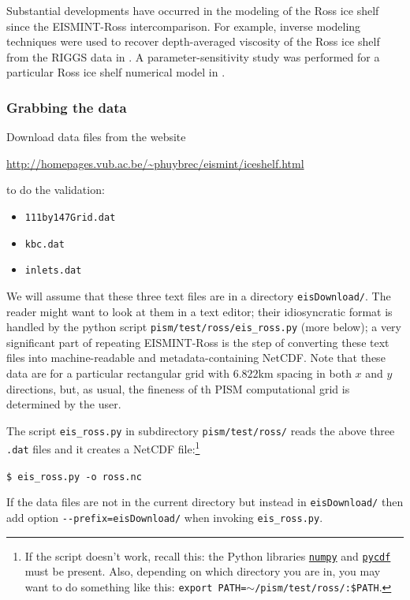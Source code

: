 \documentclass[11pt,final]{amsart}
\begin{document}
Substantial developments have occurred in the modeling of the Ross ice shelf since the EISMINT-Ross intercomparison.  For example, inverse modeling techniques were used to recover depth-averaged viscosity of the Ross ice shelf from the RIGGS data in \cite{RommelaereMacAyeal}. A parameter-sensitivity study was performed for a particular Ross ice shelf numerical model in \cite{HumbertGreveHutter}.

\subsubsection*{Grabbing the data}  Download data files from the website

\centerline{\url{http://homepages.vub.ac.be/~phuybrec/eismint/iceshelf.html}}

\noindent to do the validation:
\begin{itemize}
\item \verb|111by147Grid.dat|
\item \verb|kbc.dat|
\item \verb|inlets.dat|
\end{itemize}
We will assume that these three text files are in a directory \verb|eisDownload/|.  The reader might want to look at them in a text editor; their idiosyncratic format is handled by the python script \verb|pism/test/ross/eis_ross.py| (more below); a very significant part of repeating EISMINT-Ross is the step of converting these text files into machine-readable and metadata-containing NetCDF.  Note that these data are for a particular rectangular grid with $6.822$km spacing in both $x$ and $y$ directions, but, as usual, the fineness of th PISM computational grid is determined by the user.

The script \verb|eis_ross.py| in subdirectory \verb|pism/test/ross/| reads the above three \verb|.dat| files and it creates a NetCDF file:\footnote{If the script doesn't work, recall this: the Python libraries \href{http://numpy.scipy.org/}{\texttt{numpy}} and \href{http://pysclint.sourceforge.net/pycdf/}{\texttt{pycdf}} must be present.  Also, depending on which directory you are in, you may want to do something like this: \texttt{export PATH=$\sim$/pism/test/ross/:\$PATH}.}

\verb|$ eis_ross.py -o ross.nc|

\noindent If the data files are not in the current directory but instead in \verb|eisDownload/| then add option \verb|--prefix=eisDownload/| when invoking \verb|eis_ross.py|.  
\end{document}
